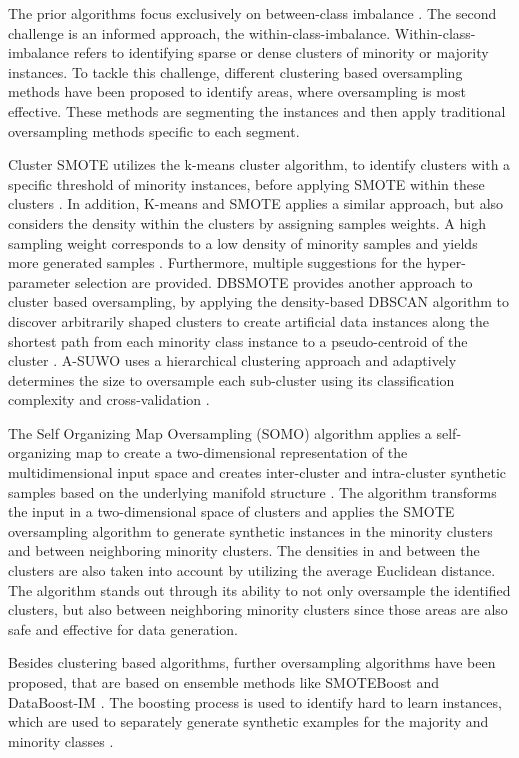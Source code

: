 \documentclass[parskip=full]{scrartcl}
\begin{document}
The prior algorithms focus exclusively on between-class imbalance
\cite{Nekooeimehr2015}. The second challenge is an informed approach, the
within-class-imbalance. Within-class-imbalance refers to identifying sparse or
dense clusters of minority or majority instances. To tackle this challenge,
different clustering based oversampling methods have been proposed to identify
areas, where oversampling is most effective. These methods are segmenting the
instances and then apply traditional oversampling methods specific to each
segment. 

Cluster SMOTE utilizes the k-means cluster algorithm, to identify clusters with
a specific threshold of minority instances, before applying SMOTE within these
clusters \cite{CieslakCS06}. In addition, K-means and SMOTE applies a similar
approach, but also considers the density within the clusters by assigning
samples weights. A high sampling weight corresponds to a low density of minority
samples and yields more generated samples \cite{Douzas2018}. Furthermore, multiple
suggestions for the hyper-parameter selection are provided. DBSMOTE provides
another approach to cluster based oversampling, by applying the density-based
DBSCAN algorithm to discover arbitrarily shaped clusters to create artificial
data instances along the shortest path from each minority class instance to a
pseudo-centroid of the cluster \cite{Bunkhumpornpat2011}. A-SUWO uses a
hierarchical clustering approach and adaptively determines the size to
oversample each sub-cluster using its classification complexity and
cross-validation \cite{Nekooeimehr2015}. 

The Self Organizing Map Oversampling (SOMO) algorithm applies a self-organizing
map to create a two-dimensional representation of the multidimensional input
space and creates inter-cluster and intra-cluster synthetic samples based on the
underlying manifold structure \cite{Douzas2017B}. The algorithm transforms the
input in a two-dimensional space of clusters and applies the SMOTE oversampling
algorithm to generate synthetic instances in the minority clusters and between
neighboring minority clusters. The densities in and between the clusters are
also taken into account by utilizing the average Euclidean distance. The
algorithm stands out through its ability to not only oversample the identified
clusters, but also between neighboring minority clusters since those areas are
also safe and effective for data generation.  

Besides clustering based algorithms, further oversampling algorithms have been
proposed, that are based on ensemble methods like SMOTEBoost \cite{Chawla2003}
and DataBoost-IM \cite{Guo2004}. The boosting process is used to identify hard
to learn instances, which are used to separately generate synthetic examples for
the majority and minority classes  \cite{Guo2004}.
\end{document}
